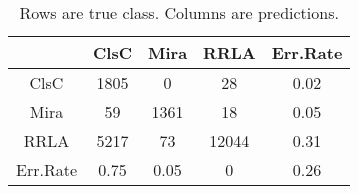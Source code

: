 \begin{table}[h]
\begin{center}
\begin{tabular}{cccc|c}
  & ClsC & Mira & RRLA & Err.Rate \\ 
  \hline
ClsC & 1805 & 0 & 28 & 0.02 \\ 
  Mira & 59 & 1361 & 18 & 0.05 \\ 
  RRLA & 5217 & 73 & 12044 & 0.31 \\ 
   \hline
Err.Rate & 0.75 & 0.05 & 0 & 0.26 \\ 
  \end{tabular}
\caption{Rows are true class. Columns are predictions.}
\end{center}
\end{table}
